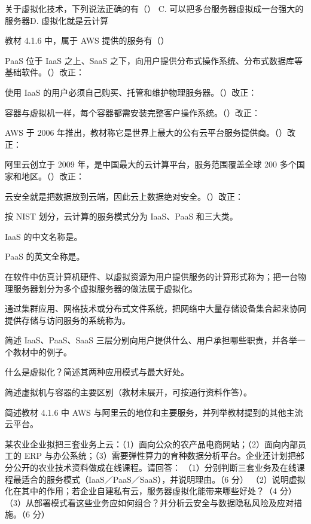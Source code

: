 \documentclass[a4paper,11pt]{article}
\begin{document}
\q 关于虚拟化技术，下列说法正确的有（\quad）
{C. 可以把多台服务器虚拟成一台强大的服务器}{D. 虚拟化就是云计算}

\q 教材 4.1.6 中，属于 AWS 提供的服务有（\quad）

\q PaaS 位于 IaaS 之上、SaaS 之下，向用户提供分布式操作系统、分布式数据库等基础软件。\quad（\quad）\quad 改正：\fixblank

\q 使用 IaaS 的用户必须自己购买、托管和维护物理服务器。\quad（\quad）\quad 改正：\fixblank

\q 容器与虚拟机一样，每个容器都需安装完整客户操作系统。\quad（\quad）\quad 改正：\fixblank

\q AWS 于 2006 年推出，教材称它是世界上最大的公有云平台服务提供商。\quad（\quad）\quad 改正：\fixblank

\q 阿里云创立于 2009 年，是中国最大的云计算平台，服务范围覆盖全球 200 多个国家和地区。\quad（\quad）\quad 改正：\fixblank

\q 云安全就是把数据放到云端，因此云上数据绝对安全。\quad（\quad）\quad 改正：\fixblank

\q 按 NIST 划分，云计算的服务模式分为 IaaS、PaaS 和\fillblanks[2.0cm]三大类。

\q IaaS 的中文名称是\fillblanks[3.2cm]。

\q PaaS 的英文全称是\fillblanks[5.2cm]。

\q 在软件中仿真计算机硬件、以虚拟资源为用户提供服务的计算形式称为\fillblanks[2.0cm]；把一台物理服务器划分为多个虚拟服务器的做法属于\fillblanks[2.2cm]虚拟化。

\q 通过集群应用、网格技术或分布式文件系统，把网络中大量存储设备集合起来协同提供存储与访问服务的系统称为\fillblanks[2.2cm]。

\newpage
{}
\q 简述 IaaS、PaaS、SaaS 三层分别向用户提供什么、用户承担哪些职责，并各举一个教材中的例子。\anslines{2.4cm}

\q 什么是虚拟化？简述其两种应用模式与最大好处。\anslines{2.4cm}

\q 简述虚拟机与容器的主要区别（教材未展开，可按通行资料作答）。\anslines{2.4cm}

\q 简述教材 4.1.6 中 AWS 与阿里云的地位和主要服务，并列举教材提到的其他主流云平台。\anslines{2.4cm}

\newpage
{}
\q 某农业企业拟把三套业务上云：（1）面向公众的农产品电商网站；（2）面向内部员工的 ERP 与办公系统；（3）需要弹性算力的育种数据分析平台。企业还计划把部分公开的农业技术资料做成在线课程。请回答：
（1）分别判断三套业务及在线课程最适合的服务模式（IaaS／PaaS／SaaS），并说明理由。（6 分）
（2）说明虚拟化在其中的作用；若企业自建私有云，服务器虚拟化能带来哪些好处？（4 分）
（3）从部署模式看这些业务应如何组合？并分析云安全与数据隐私风险及应对措施。（6 分）\anslines{5cm}
\end{document}

